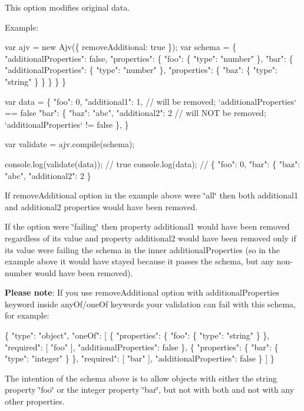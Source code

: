 This option modifies original data.

Example\+:


\begin{DoxyCode}
var ajv = new Ajv(\{ removeAdditional: true \});
var schema = \{
  "additionalProperties": false,
  "properties": \{
    "foo": \{ "type": "number" \},
    "bar": \{
      "additionalProperties": \{ "type": "number" \},
      "properties": \{
        "baz": \{ "type": "string" \}
      \}
    \}
  \}
\}

var data = \{
  "foo": 0,
  "additional1": 1, // will be removed; `additionalProperties` == false
  "bar": \{
    "baz": "abc",
    "additional2": 2 // will NOT be removed; `additionalProperties` != false
  \},
\}

var validate = ajv.compile(schema);

console.log(validate(data)); // true
console.log(data); // \{ "foo": 0, "bar": \{ "baz": "abc", "additional2": 2 \}
\end{DoxyCode}


If {\ttfamily remove\+Additional} option in the example above were {\ttfamily \char`\"{}all\char`\"{}} then both {\ttfamily additional1} and {\ttfamily additional2} properties would have been removed.

If the option were {\ttfamily \char`\"{}failing\char`\"{}} then property {\ttfamily additional1} would have been removed regardless of its value and property {\ttfamily additional2} would have been removed only if its value were failing the schema in the inner {\ttfamily additional\+Properties} (so in the example above it would have stayed because it passes the schema, but any non-\/number would have been removed).

{\bfseries Please note}\+: If you use {\ttfamily remove\+Additional} option with {\ttfamily additional\+Properties} keyword inside {\ttfamily any\+Of}/{\ttfamily one\+Of} keywords your validation can fail with this schema, for example\+:


\begin{DoxyCode}
\{
  "type": "object",
  "oneOf": [
    \{
      "properties": \{
        "foo": \{ "type": "string" \}
      \},
      "required": [ "foo" ],
      "additionalProperties": false
    \},
    \{
      "properties": \{
        "bar": \{ "type": "integer" \}
      \},
      "required": [ "bar" ],
      "additionalProperties": false
    \}
  ]
\}
\end{DoxyCode}


The intention of the schema above is to allow objects with either the string property \char`\"{}foo\char`\"{} or the integer property \char`\"{}bar\char`\"{}, but not with both and not with any other properties.

